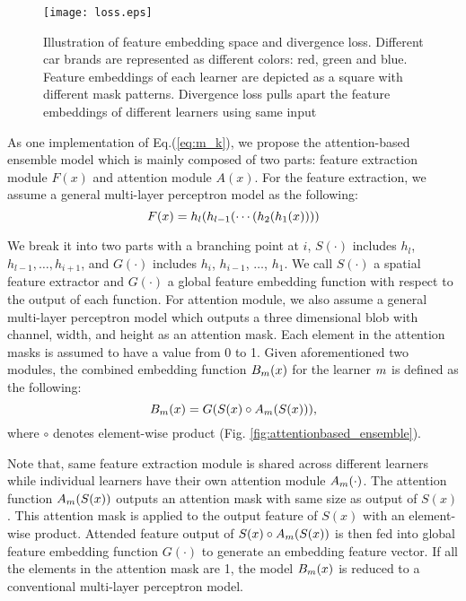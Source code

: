 \documentclass[runningheads]{llncs}
\begin{document}
\begin{figure}[t]
\centering
\texttt{[image: loss.eps]}
\vspace{-3mm}
\caption{Illustration of feature embedding space and divergence loss. Different car brands are represented as different colors: red, green and blue. Feature embeddings of each learner are depicted as a square with different mask patterns. Divergence loss pulls apart the feature embeddings of different learners using same input}
\vspace{-5mm}
\label{fig:loss}
\end{figure}


As one implementation of Eq.(\ref{eq:m_k}), we propose the attention-based ensemble model which is mainly composed of two parts:
 feature extraction module $F(x)$ and attention module $A(x)$. For the feature extraction, we assume a general multi-layer perceptron model as the following:
\vspace{-2mm}
\begin{equation}
	F(x)=h_l(h_{l-1}( \cdots (h_2(h_1(x))))
\label{eq:feature}
\vspace{-2mm}
\end{equation}

We break it into two parts with a branching point at $i$, $S(\cdot)$ includes $h_l$, $h_{l-1}, \dots, h_{i+1}$,
 and $G(\cdot)$ includes $h_i$, $h_{i-1}$, $\dots$, $h_1$.
We call $S(\cdot)$ a spatial feature extractor and $G(\cdot)$ a global feature embedding function
 with respect to the output of each function. For attention module,
 we also assume a general multi-layer perceptron model which outputs a three dimensional blob with channel, width, and height as an attention mask.
Each element in the attention masks is assumed to have a value from 0 to 1.
Given aforementioned two modules, the combined embedding function $B_m(x)$ for the learner $m$ is defined as the following:
\vspace{-2mm}
\begin{equation}
	\Ensemblefunc_\ensemblesub(x) = G(S(x) \circ A_\ensemblesub(S(x)) ),
\label{eq:embedding}
\vspace{-2mm}
\end{equation}
where $\circ$ denotes element-wise product (Fig. \ref{fig:attentionbased_ensemble}).

Note that, same feature extraction module is shared across different learners while individual learners have their own attention module $A_m(\cdot)$.
The attention function $A_m(S(x))$ outputs an attention mask with same size as output of $S(x)$.
This attention mask is applied to the output feature of $S(x)$ with an element-wise product.
Attended feature output of $S(x) \circ A_m(S(x))$ is then fed into global feature embedding function
 $G(\cdot)$ to generate an embedding feature vector.
If all the elements in the attention mask are 1, the model $B_m(x)$ is reduced to a conventional multi-layer perceptron model.
\end{document}
